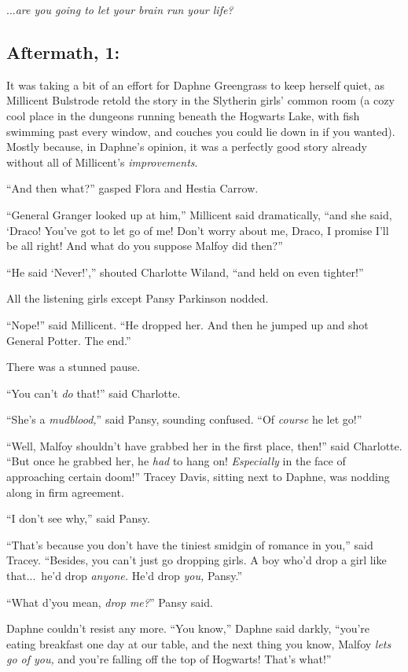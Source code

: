 ...\emph{are you going to let your brain run your life?}
\replacement{\sbreak}{}

\subsection{Aftermath, 1:}

It was taking a bit of an effort for Daphne Greengrass to keep herself quiet, as Millicent Bulstrode retold the story in the Slytherin girls’ common room (a cozy cool place in the dungeons running beneath the Hogwarts Lake, with fish swimming past every window, and couches you could lie down in if you wanted). Mostly because, in Daphne’s opinion, it was a perfectly good story already without all of Millicent’s \emph{improvements}.

“And then what?” gasped Flora and Hestia Carrow.

“General Granger looked up at him,” Millicent said dramatically, “and she said, ‘Draco! You’ve got to let go of me! Don’t worry about me, Draco, I promise I’ll be all right! And what do you suppose Malfoy did then?”

“He said ‘Never!’,” shouted Charlotte Wiland, “and held on even tighter!”

All the listening girls except Pansy Parkinson nodded.

“Nope!” said Millicent. “He dropped her. And then he jumped up and shot General Potter. The end.”

There was a stunned pause.

“You can’t \emph{do} that!” said Charlotte.

“She’s a \emph{mudblood,}” said Pansy, sounding confused. “Of \emph{course} he let go!”

“Well, Malfoy shouldn’t have grabbed her in the first place, then!” said Charlotte. “But once he grabbed her, he \emph{had} to hang on! \emph{Especially} in the face of approaching certain doom!” Tracey Davis, sitting next to Daphne, was nodding along in firm agreement.

“I don’t see why,” said Pansy.

“That’s because you don’t have the tiniest smidgin of romance in you,” said Tracey. “Besides, you can’t just go dropping girls. A boy who’d drop a girl like that...\ he’d drop \emph{anyone.} He’d drop \emph{you,} Pansy.”

“What d’you mean, \emph{drop me?}” Pansy said.

Daphne couldn’t resist any more. “You know,” Daphne said darkly, “you’re eating breakfast one day at our table, and the next thing you know, Malfoy \emph{lets go of you,} and you’re falling off the top of Hogwarts! That’s what!”

